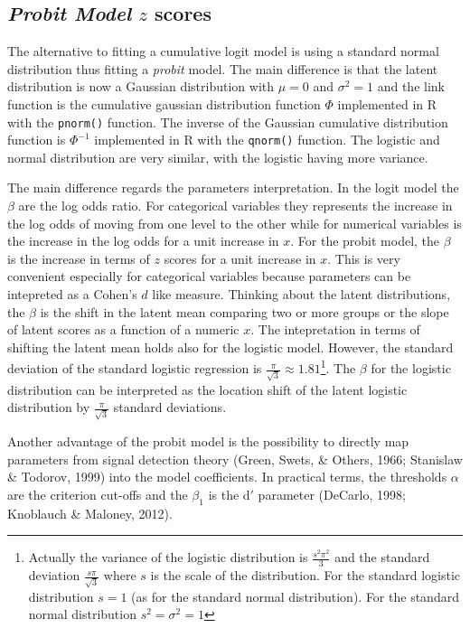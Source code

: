 \documentclass[
  man,floatsintext]{apa6}
\begin{document}
\subsection{\texorpdfstring{\emph{Probit Model} \(z\) scores}{Probit Model z scores}}\label{probit-model-z-scores}

The alternative to fitting a cumulative logit model is using a standard normal distribution thus fitting a \emph{probit} model. The main difference is that the latent distribution is now a Gaussian distribution with \(\mu = 0\) and \(\sigma^2 = 1\) and the link function is the cumulative gaussian distribution function \(\Phi\) implemented in R with the \texttt{pnorm()} function. The inverse of the Gaussian cumulative distribution function is \(\Phi^{-1}\) implemented in R with the \texttt{qnorm()} function. The logistic and normal distribution are very similar, with the logistic having more variance.

The main difference regards the parameters interpretation. In the logit model the \(\beta\) are the log odds ratio. For categorical variables they represents the increase in the log odds of moving from one level to the other while for numerical variables is the increase in the log odds for a unit increase in \(x\). For the probit model, the \(\beta\) is the increase in terms of \(z\) scores for a unit increase in \(x\). This is very convenient especially for categorical variables because parameters can be intepreted as a Cohen's \(d\) like measure. Thinking about the latent distributions, the \(\beta\) is the shift in the latent mean comparing two or more groups or the slope of latent scores as a function of a numeric \(x\). The intepretation in terms of shifting the latent mean holds also for the logistic model. However, the standard deviation of the standard logistic regression is \(\frac{\pi}{\sqrt{3}} \approx 1.81\)\footnote{Actually the variance of the logistic distribution is \(\frac{s^2\pi^2}{3}\) and the standard deviation \(\frac{s\pi}{\sqrt{3}}\) where \(s\) is the scale of the distribution. For the standard logistic distribution \(s = 1\) (as for the standard normal distribution). For the standard normal distribution \(s^2 = \sigma^2 = 1\)}. The \(\beta\) for the logistic distribution can be interpreted as the location shift of the latent logistic distribution by \(\frac{\pi}{\sqrt{3}}\) standard deviations.

Another advantage of the probit model is the possibility to directly map parameters from signal detection theory (Green, Swets, \& Others, 1966; Stanislaw \& Todorov, 1999) into the model coefficients. In practical terms, the thresholds \(\alpha\) are the criterion cut-offs and the \(\beta_1\) is the d\('\) parameter (DeCarlo, 1998; Knoblauch \& Maloney, 2012).
\end{document}
